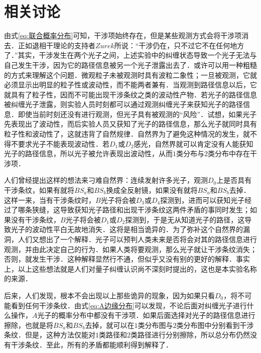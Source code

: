 \section{相关讨论}
由式\ref{eq:联合概率分布}可知，干涉项始终存在，但是某些观测方式会将干涉项消去．正如退相干理论的支持者$Zurek$所说：“干涉仍在，只不过它不在任何地方了．”其实，干涉发生在两个光子之间，上述实验中的纠缠状态导致一个光子无法与自己发生干涉，因为它的路径信息被另一个光子泄露出去了．或许可以用一种粗糙的方式来理解这个问题．微观粒子未被观测时具有波粒二象性；一旦被观测，它就必须显示出明显的粒子性或波动性，而不能两者兼有．当观测到路径信息以后，它就具有了粒子性，因而不可能出现干涉条纹之类的波动性产物．若光子的路径信息被纠缠光子泄露，则实验人员时刻都可以通过观测纠缠光子来获知光子的路径信息．即使当前时刻还没有进行观测，但光子具有被观测的“风险”．试想，如果光子先表现出了波动性，而后实验人员又获知了光子的路径信息，那么光子就同时具有粒子性和波动性了，这就违背了自然规律．自然界为了避免这种情况的发生，就不得不要求光子不能表现波动性．若$D_1$或$D_2$感光，自然界就可以肯定没有人能获知光子的路径信息，所以光子被允许表现出波动性，从而$1$类分布与$2$类分布中存在干涉项．

人们曾经提出这样的想法来刁难自然界：连续发射许多光子，观测$D_0$上是否具有干涉条纹，如果有就将$BS_a$和$BS_b$换成全反射镜，如果没有就将$BS_a$和$BS_b$去掉．这样一来，当有干涉条纹时，$B$光子将会被$D_3$或$D_4$探测到，进而可以获知光子经过了哪条狭缝，这导致获知光子路径和出现干涉条纹这两件矛盾的事同时发生；如果没有干涉条纹，$B$光子将会被$D_1$或$D_2$探测到，于是无从知道光子的路径，这导致光子的波动性平白无故地消失．这将是相当诡异的．为了弥补这个自然界的漏洞，人们又想出了一个解释．光子可以预判人类未来是否将会对其的路径信息进行观测，并由此决定自己的行为．如果人类将要观测，那么光子就让干涉条纹消失；否则，就发生干涉．这种解释显然行不通，但似乎又没有别的更好的解释．事实上，以上这些想法就是人们对量子纠缠认识尚不深刻时提出的，这也是本实验名称的来源．

后来，人们发现，根本不会出现以上那些诡异的现象，因为如果只看$D_0$，将不可能看到任何干涉条纹．由式\ref{eq:A边缘分布}可以发现，不论后面对纠缠光子进行什么操作，$A$光子的概率分布中都没有干涉项．如果后面选择对光子的路径信息进行擦除，也就是将$BS_a$和$BS_b$去掉，就可以在$1$类分布图与$2$类分布图中分别看到干涉条纹．但是，这种方法仅能对$1$类路径和$2$类路径进行分别擦除，所以总分布仍然没有干涉条纹．至此，所有的矛盾都能顺利得到解释了．